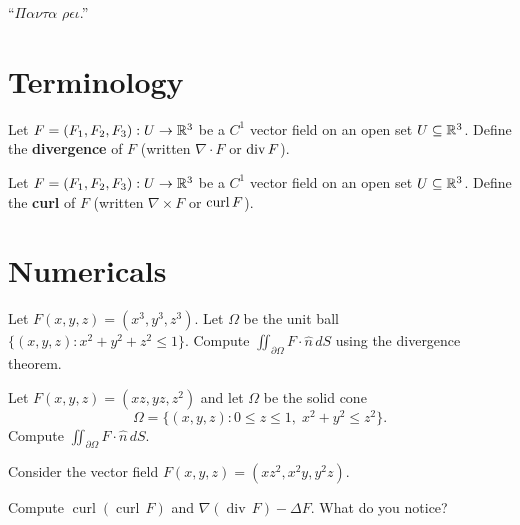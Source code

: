 \documentclass{homework}
\author{Jim Fowler}
\begin{document}
\maketitle

\begin{inspiration}
``$\Pi\alpha\nu\tau\alpha$ $\rho\epsilon\iota$.''
\end{inspiration}

\section{Terminology}

\begin{problem}\label{divergence-definition}%
  Let $F = (F_1, F_2, F_3) : U \to \mathbb{R}^3$ be a $C^1$ vector field on an open set $U \subseteq \mathbb{R}^3$.
  Define the \textbf{divergence} of $F$ (written $\nabla \cdot F$ or $\operatorname{div} F$).
\end{problem}

\begin{problem}\label{curl-definition}%
  Let $F = (F_1, F_2, F_3) : U \to \mathbb{R}^3$ be a $C^1$ vector field on an open set $U \subseteq \mathbb{R}^3$.
  Define the \textbf{curl} of $F$ (written $\nabla \times F$ or $\operatorname{curl} F$).
\end{problem}

\section{Numericals}

\begin{problem}
  Let $F(x,y,z) = (x^3, y^3, z^3)$.
  Let $\Omega$ be the unit ball $\{(x,y,z) : x^2+y^2+z^2 \le 1\}$.
  Compute $\displaystyle\iint_{\partial\Omega} F \cdot \hat{n}\,dS$ using the divergence theorem.
\end{problem}

\begin{problem}
  Let $F(x,y,z) = (xz, yz, z^2)$ and let $\Omega$ be the solid cone
  \[
    \Omega = \{(x,y,z) : 0 \le z \le 1,\; x^2+y^2 \le z^2\}.
  \]
  Compute $\displaystyle\iint_{\partial\Omega} F\cdot\hat{n}\,dS$.
\end{problem}

\begin{problem}\label{curl-curl-identity}%
  Consider the vector field $F(x,y,z)=(xz^2, x^2y, y^2z)$.

  Compute $\operatorname{curl}(\operatorname{curl}\, F)$ and $\nabla(\operatorname{div}\, F) - \Delta F$. What do you notice?
\end{problem}
\end{document}
